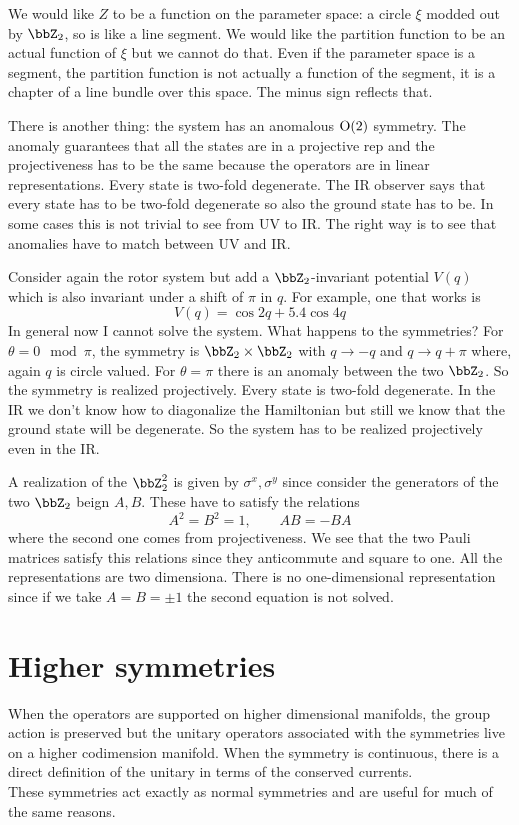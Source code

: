 We would like $Z$ to be a function on the parameter space: a circle $\xi$ modded out by $\bbZ_{2}$, so is like a line segment. We would like the partition function to be an actual function of $\xi$ but we cannot do that. Even if the parameter space is a segment, the partition function is not actually a function of the segment, it is a chapter of a line bundle over this space. The minus sign reflects that.

There is another thing: the system has an anomalous $\mathrm{O}(2)$ symmetry. The anomaly guarantees that all the states are in a projective rep and the projectiveness has to be the same because the operators are in linear representations. Every state is two-fold degenerate. The IR observer says that every state has to be two-fold degenerate so also the ground state has to be. In some cases this is not trivial to see from UV to IR. The right way is to see that anomalies have to match between UV and IR.

Consider again the rotor system but add a $\bbZ_{2}$-invariant potential $V(q)$ which is also invariant under a shift of $\pi$ in $q$. For example, one that works is
\begin{equation}
	V(q)=\cos 2q+5.4\cos 4q
\end{equation}
In general now I cannot solve the system. What happens to the symmetries? For $\theta=0 \mod \pi$, the symmetry is $\bbZ_{2}\times\bbZ_{2}$ with $q\rightarrow -q$ and $q\rightarrow q+\pi$ where, again $q$ is circle valued. For $\theta=\pi$ there is an anomaly between the two $\bbZ_{2}$. So the symmetry is realized projectively. Every state is two-fold degenerate. In the IR we don't know how to diagonalize the Hamiltonian but still we know that the ground state will be degenerate. So the system has to be realized projectively even in the IR.

A realization of the $\bbZ_{2}^{2}$ is given by $\sigma^{x},\sigma^{y}$ since consider the generators of the two $\bbZ_{2}$ beign $A,B$. These have to satisfy the relations
\begin{equation}
	A^{2}=B^{2}=1,\qquad AB=-BA
\end{equation}
where the second one comes from projectiveness. We see that the two Pauli matrices satisfy this relations since they anticommute and square to one. All the representations are two dimensiona. There is no one-dimensional representation since if we take $A=B=\pm1$ the second equation is not solved.

\section{Higher symmetries}
When the operators are supported on higher dimensional manifolds, the group action is preserved but the unitary operators associated with the symmetries live on a higher codimension manifold. When the symmetry is continuous, there is a direct definition of the unitary in terms of the conserved currents.\\
These symmetries act exactly as normal symmetries and are useful for much of the same reasons.

